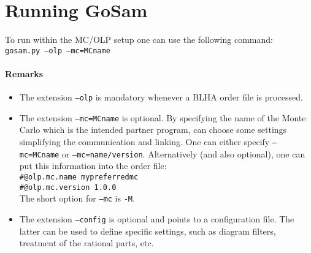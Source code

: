 \clearpage

\section{Running GoSam}
To run \gosam{} within the MC/OLP setup one can use the following command:\\
{\tt gosam.py --olp --mc=MCname }\\

\paragraph{Remarks}
\begin{itemize}
\item The extension \texttt{--olp} is mandatory whenever 
   a BLHA order file is processed.
\item The extension \texttt{--mc=MCname} is optional. By specifying the
   name of the Monte Carlo which is the intended partner program,
   \gosam{} can choose some settings simplifying the communication and linking.
   One can either specify \texttt{--mc=MCname} or \texttt{--mc=name/version}.
   Alternatively (and also optional),
   one can put this information into the order file:\\
{\tt \#@olp.mc.name mypreferredmc}\\
{\tt \#@olp.mc.version 1.0.0}\\
   The short option for \texttt{--mc} is \texttt{-M}.
\item The extension \texttt{--config} is optional and points to a \gosam{} configuration file.
   The latter can be used to define \gosam{} specific settings, such as  
   diagram filters, treatment of the rational parts, etc.
   

\end{itemize}
